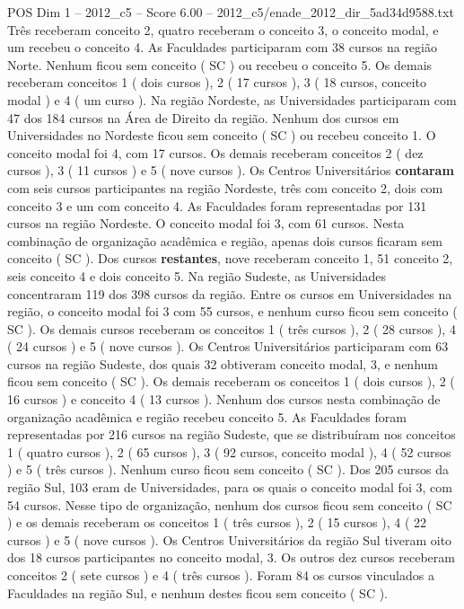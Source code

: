 \begin{textsample}{POS Dim 1 – 2012\_c5 – Score 6.00 – 2012\_c5/enade\_2012\_dir\_5ad34d9588.txt}
Três receberam conceito 2, quatro receberam o conceito 3, o conceito modal, e um recebeu o conceito 4.
As Faculdades participaram com 38 cursos na região Norte.
Nenhum ficou sem conceito ( SC ) ou recebeu o conceito 5.
Os demais receberam conceitos 1 ( dois cursos ), 2 ( 17 cursos ), 3 ( 18 cursos, conceito modal ) e 4 ( um curso ).
Na região Nordeste, as Universidades participaram com 47 dos 184 cursos na Área de Direito da região.
Nenhum dos cursos em Universidades no Nordeste ficou sem conceito ( SC ) ou recebeu conceito 1.
O conceito modal foi 4, com 17 cursos.
Os demais receberam conceitos 2 ( dez cursos ), 3 ( 11 cursos ) e 5 ( nove cursos ).
Os Centros Universitários \textbf{contaram} com seis cursos participantes na região Nordeste, três com conceito 2, dois com conceito 3 e um com conceito 4.
As Faculdades foram representadas por 131 cursos na região Nordeste.
O conceito modal foi 3, com 61 cursos.
Nesta combinação de organização acadêmica e região, apenas dois cursos ficaram sem conceito ( SC ).
Dos cursos \textbf{restantes}, nove receberam conceito 1, 51 conceito 2, seis conceito 4 e dois conceito 5.
Na região Sudeste, as Universidades concentraram 119 dos 398 cursos da região.
Entre os cursos em Universidades na região, o conceito modal foi 3 com 55 cursos, e nenhum curso ficou sem conceito ( SC ).
Os demais cursos receberam os conceitos 1 ( três cursos ), 2 ( 28 cursos ), 4 ( 24 cursos ) e 5 ( nove cursos ).
Os Centros Universitários participaram com 63 cursos na região Sudeste, dos quais 32 obtiveram conceito modal, 3, e nenhum ficou sem conceito ( SC ).
Os demais receberam os conceitos 1 ( dois cursos ), 2 ( 16 cursos ) e conceito 4 ( 13 cursos ).
Nenhum dos cursos nesta combinação de organização acadêmica e região recebeu conceito 5.
As Faculdades foram representadas por 216 cursos na região Sudeste, que se distribuíram nos conceitos 1 ( quatro cursos ), 2 ( 65 cursos ), 3 ( 92 cursos, conceito modal ), 4 ( 52 cursos ) e 5 ( três cursos ).
Nenhum curso ficou sem conceito ( SC ).
Dos 205 cursos da região Sul, 103 eram de Universidades, para os quais o conceito modal foi 3, com 54 cursos.
Nesse tipo de organização, nenhum dos cursos ficou sem conceito ( SC ) e os demais receberam os conceitos 1 ( três cursos ), 2 ( 15 cursos ), 4 ( 22 cursos ) e 5 ( nove cursos ).
Os Centros Universitários da região Sul tiveram oito dos 18 cursos participantes no conceito modal, 3.
Os outros dez cursos receberam conceitos 2 ( sete cursos ) e 4 ( três cursos ).
Foram 84 os cursos vinculados a Faculdades na região Sul, e nenhum destes ficou sem conceito ( SC ).

\end{textsample}
